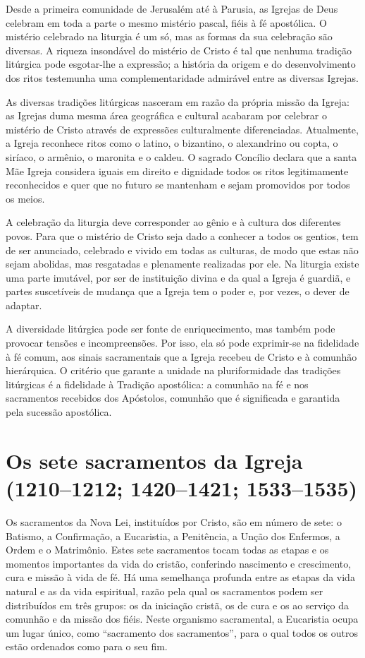 Desde a primeira comunidade de Jerusalém até à Parusia, as Igrejas de Deus celebram em toda a parte o mesmo mistério pascal, fiéis à fé apostólica. O mistério celebrado na liturgia é um só, mas as formas da sua celebração são diversas. A riqueza insondável do mistério de Cristo é tal que nenhuma tradição litúrgica pode esgotar-lhe a expressão; a história da origem e do desenvolvimento dos ritos testemunha uma complementaridade admirável entre as diversas Igrejas.

As diversas tradições litúrgicas nasceram em razão da própria missão da Igreja: as Igrejas duma mesma área geográfica e cultural acabaram por celebrar o mistério de Cristo através de expressões culturalmente diferenciadas. Atualmente, a Igreja reconhece ritos como o latino, o bizantino, o alexandrino ou copta, o siríaco, o armênio, o maronita e o caldeu. O sagrado Concílio declara que a santa Mãe Igreja considera iguais em direito e dignidade todos os ritos legitimamente reconhecidos e quer que no futuro se mantenham e sejam promovidos por todos os meios.

A celebração da liturgia deve corresponder ao gênio e à cultura dos diferentes povos. Para que o mistério de Cristo seja dado a conhecer a todos os gentios, tem de ser anunciado, celebrado e vivido em todas as culturas, de modo que estas não sejam abolidas, mas resgatadas e plenamente realizadas por ele. Na liturgia existe uma parte imutável, por ser de instituição divina e da qual a Igreja é guardiã, e partes suscetíveis de mudança que a Igreja tem o poder e, por vezes, o dever de adaptar.

A diversidade litúrgica pode ser fonte de enriquecimento, mas também pode provocar tensões e incompreensões. Por isso, ela só pode exprimir-se na fidelidade à fé comum, aos sinais sacramentais que a Igreja recebeu de Cristo e à comunhão hierárquica. O critério que garante a unidade na pluriformidade das tradições litúrgicas é a fidelidade à Tradição apostólica: a comunhão na fé e nos sacramentos recebidos dos Apóstolos, comunhão que é significada e garantida pela sucessão apostólica.

\section{Os sete sacramentos da Igreja (1210--1212; 1420--1421; 1533--1535)}

Os sacramentos da Nova Lei, instituídos por Cristo, são em número de sete: o Batismo, a Confirmação, a Eucaristia, a Penitência, a Unção dos Enfermos, a Ordem e o Matrimônio. Estes sete sacramentos tocam todas as etapas e os momentos importantes da vida do cristão, conferindo nascimento e crescimento, cura e missão à vida de fé. Há uma semelhança profunda entre as etapas da vida natural e as da vida espiritual, razão pela qual os sacramentos podem ser distribuídos em três grupos: os da iniciação cristã, os de cura e os ao serviço da comunhão e da missão dos fiéis. Neste organismo sacramental, a Eucaristia ocupa um lugar único, como ``sacramento dos sacramentos'', para o qual todos os outros estão ordenados como para o seu fim.

